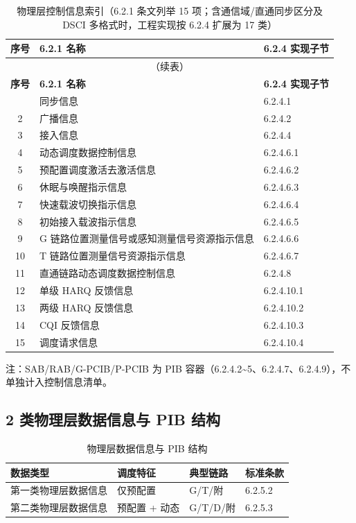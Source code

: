 \documentclass[11pt,a4paper]{ctexart}
\begin{document}
\begin{longtable}{cll}
\caption{物理层控制信息索引（6.2.1 条文列举 15 项；含通信域/直通同步区分及 DSCI 多格式时，工程实现按 6.2.4 扩展为 17 类）} \\
\toprule
\textbf{序号} & \textbf{6.2.1 名称} & \textbf{6.2.4 实现子节} \\
\midrule
\endfirsthead
\multicolumn{3}{c}{\small（续表）} \\
\toprule
\textbf{序号} & \textbf{6.2.1 名称} & \textbf{6.2.4 实现子节} \\
\midrule
\endhead
\bottomrule
\endfoot
1 & 同步信息 & 6.2.4.1 \\
2 & 广播信息 & 6.2.4.2 \\
3 & 接入信息 & 6.2.4.4 \\
4 & 动态调度数据控制信息 & 6.2.4.6.1 \\
5 & 预配置调度激活去激活信息 & 6.2.4.6.2 \\
6 & 休眠与唤醒指示信息 & 6.2.4.6.3 \\
7 & 快速载波切换指示信息 & 6.2.4.6.4 \\
8 & 初始接入载波指示信息 & 6.2.4.6.5 \\
9 & G 链路位置测量信号或感知测量信号资源指示信息 & 6.2.4.6.6 \\
10 & T 链路位置测量信号资源指示信息 & 6.2.4.6.7 \\
11 & 直通链路动态调度数据控制信息 & 6.2.4.8 \\
12 & 单级 HARQ 反馈信息 & 6.2.4.10.1 \\
13 & 两级 HARQ 反馈信息 & 6.2.4.10.2 \\
14 & CQI 反馈信息 & 6.2.4.10.3 \\
15 & 调度请求信息 & 6.2.4.10.4 \\
\end{longtable}
{\small 注：SAB/RAB/G-PCIB/P-PCIB 为 PIB 容器（6.2.4.2\textasciitilde 5、6.2.4.7、6.2.4.9），不单独计入控制信息清单。}

\subsection{2 类物理层数据信息与 PIB 结构}

\begin{longtable}{llll}
\caption{物理层数据信息与 PIB 结构} \\
\toprule
\textbf{数据类型} & \textbf{调度特征} & \textbf{典型链路} & \textbf{标准条款} \\
\midrule
第一类物理层数据信息 & 仅预配置 & G/T/附 & 6.2.5.2 \\
第二类物理层数据信息 & 预配置 + 动态 & G/T/D/附 & 6.2.5.3 \\
\bottomrule
\end{longtable}
\end{document}
